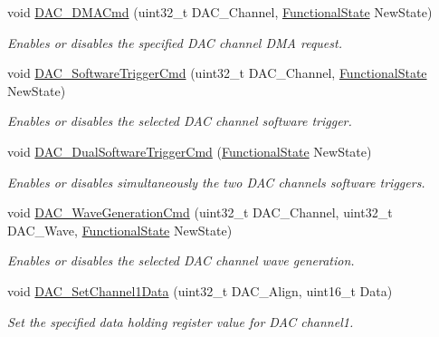 \begin{DoxyCompactItemize}
void \mbox{\hyperlink{group___d_a_c___exported___functions_ga194cba38f60ace11658824f0250121f4}{D\+A\+C\+\_\+\+D\+M\+A\+Cmd}} (uint32\+\_\+t D\+A\+C\+\_\+\+Channel, \mbox{\hyperlink{group___exported__types_gac9a7e9a35d2513ec15c3b537aaa4fba1}{Functional\+State}} New\+State)
\begin{DoxyCompactList}\small\item\em Enables or disables the specified D\+AC channel D\+MA request. \end{DoxyCompactList}\item 
void \mbox{\hyperlink{group___d_a_c___exported___functions_ga46f9f7f6b9520a86e300fe966afe5fb3}{D\+A\+C\+\_\+\+Software\+Trigger\+Cmd}} (uint32\+\_\+t D\+A\+C\+\_\+\+Channel, \mbox{\hyperlink{group___exported__types_gac9a7e9a35d2513ec15c3b537aaa4fba1}{Functional\+State}} New\+State)
\begin{DoxyCompactList}\small\item\em Enables or disables the selected D\+AC channel software trigger. \end{DoxyCompactList}\item 
void \mbox{\hyperlink{group___d_a_c___exported___functions_gab4d3b364a6b184dcd65f3b294ebf56dc}{D\+A\+C\+\_\+\+Dual\+Software\+Trigger\+Cmd}} (\mbox{\hyperlink{group___exported__types_gac9a7e9a35d2513ec15c3b537aaa4fba1}{Functional\+State}} New\+State)
\begin{DoxyCompactList}\small\item\em Enables or disables simultaneously the two D\+AC channels software triggers. \end{DoxyCompactList}\item 
void \mbox{\hyperlink{group___d_a_c___exported___functions_gabd51ae6880821d4dcd923969ec19a19e}{D\+A\+C\+\_\+\+Wave\+Generation\+Cmd}} (uint32\+\_\+t D\+A\+C\+\_\+\+Channel, uint32\+\_\+t D\+A\+C\+\_\+\+Wave, \mbox{\hyperlink{group___exported__types_gac9a7e9a35d2513ec15c3b537aaa4fba1}{Functional\+State}} New\+State)
\begin{DoxyCompactList}\small\item\em Enables or disables the selected D\+AC channel wave generation. \end{DoxyCompactList}\item 
void \mbox{\hyperlink{group___d_a_c___exported___functions_gad06b4230d2b17d1d13f41dce4c782461}{D\+A\+C\+\_\+\+Set\+Channel1\+Data}} (uint32\+\_\+t D\+A\+C\+\_\+\+Align, uint16\+\_\+t Data)
\begin{DoxyCompactList}\small\item\em Set the specified data holding register value for D\+AC channel1. \end{DoxyCompactList}\item 

\end{DoxyCompactItemize}
